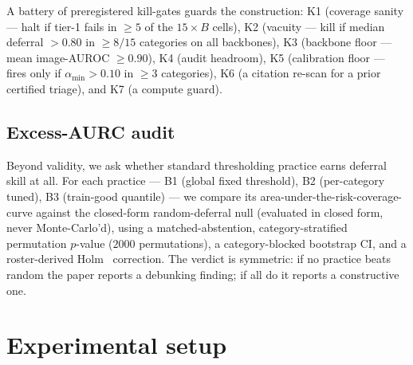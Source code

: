 \documentclass[preprint,11pt]{elsarticle}
\begin{document}
A battery of preregistered kill-gates guards the construction: K1 (coverage sanity --- halt if
tier-1 fails in $\ge 5$ of the $15\!\times\!B$ cells), K2 (vacuity --- kill if median deferral
$>0.80$ in $\ge 8/15$ categories on all backbones), K3 (backbone floor --- mean image-AUROC
$\ge 0.90$), K4 (audit headroom), K5 (calibration floor --- fires only if $\alpha_{\min}>0.10$ in
$\ge 3$ categories), K6 (a citation re-scan for a prior certified triage), and K7 (a compute guard).

\subsection{Excess-AURC audit}
\label{sec:audit}

Beyond validity, we ask whether standard thresholding practice earns deferral skill at all.
For each practice --- B1 (global fixed threshold), B2 (per-category tuned), B3 (train-good quantile)
--- we compare its area-under-the-risk-coverage-curve against the closed-form random-deferral null
(evaluated in closed form, never Monte-Carlo'd), using a matched-abstention,
category-stratified permutation $p$-value ($2000$ permutations), a category-blocked bootstrap CI,
and a roster-derived Holm~\citep{holm1979simple} correction. The verdict is symmetric: if no
practice beats random the paper reports a debunking finding; if all do it reports a constructive one.

\section{Experimental setup}
\label{sec:setup}
\end{document}
